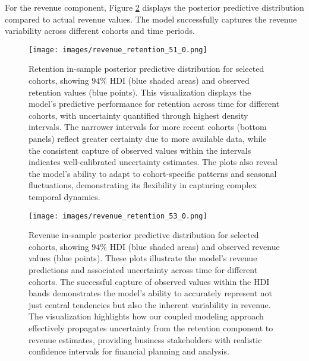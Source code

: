 \documentclass[11pt]{amsart}
\theoremstyle{definition}
\begin{document}
For the revenue component, Figure \ref{fig:in_sample_revenue} displays the posterior predictive distribution compared to
actual revenue values. The model successfully captures the revenue variability across different cohorts and time periods.

\begin{figure}
    \centering
    \texttt{[image: images/revenue\_retention\_51\_0.png]}
    \caption{Retention in-sample posterior predictive distribution for selected cohorts, showing $94\%$ HDI (blue shaded areas)
        and observed retention values (blue points). This visualization displays the model's predictive performance for
        retention across time for different cohorts, with uncertainty quantified through highest density intervals.
        The narrower intervals for more recent cohorts (bottom panels) reflect greater certainty due to more available
        data, while the consistent capture of observed values within the intervals indicates well-calibrated uncertainty
        estimates. The plots also reveal the model's ability to adapt to cohort-specific patterns and seasonal
        fluctuations, demonstrating its flexibility in capturing complex temporal dynamics.}
    \label{fig:in_sample_retention}
\end{figure}

\begin{figure}
    \centering
    \texttt{[image: images/revenue\_retention\_53\_0.png]}
    \caption{Revenue in-sample posterior predictive distribution for selected cohorts, showing $94\%$ HDI (blue shaded areas)
        and observed revenue values (blue points). These plots illustrate the model's revenue predictions and associated
        uncertainty across time for different cohorts. The successful capture of observed values within the HDI bands
        demonstrates the model's ability to accurately represent not just central tendencies but also the inherent
        variability in revenue. The visualization highlights how our coupled modeling approach effectively propagates
        uncertainty from the retention component to revenue estimates, providing business stakeholders with realistic
        confidence intervals for financial planning and analysis.}
    \label{fig:in_sample_revenue}
\end{figure}
\end{document}
